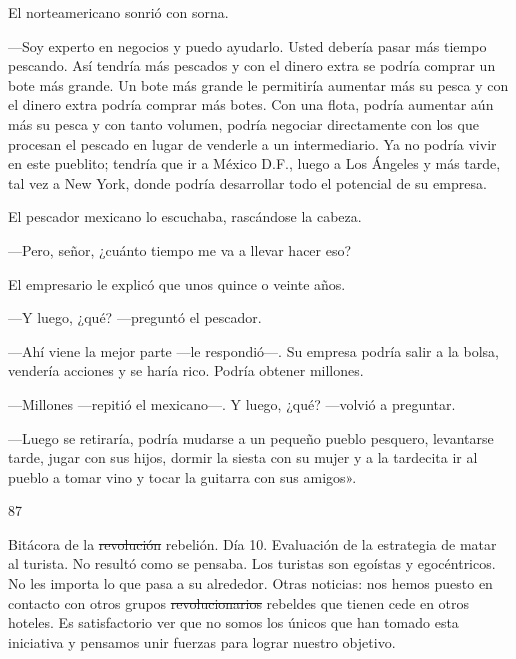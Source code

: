 \documentclass[12pt,twoside,openright,a5paper]{book}
\begin{document}
El norteamericano sonrió con sorna. 

---Soy experto en negocios y puedo
ayudarlo. Usted debería pasar más tiempo pescando. Así tendría más
pescados y con el dinero extra se podría comprar un bote más grande. Un
bote más grande le permitiría aumentar más su pesca y con el dinero
extra podría comprar más botes. Con una flota, podría aumentar aún más su
pesca y con tanto volumen, podría negociar directamente con los que procesan
el pescado en lugar de venderle a un intermediario. Ya no podría vivir en
este pueblito; tendría que ir a México D.F., luego a Los Ángeles y más tarde,
tal vez a New York, donde podría desarrollar todo el potencial de su empresa.

El pescador mexicano lo escuchaba, rascándose la cabeza. 

---Pero, señor, ¿cuánto tiempo me va a llevar hacer eso? 

El empresario le explicó que unos quince o veinte años.

---Y luego, ¿qué? ---preguntó el pescador. 

---Ahí viene la mejor parte ---le respondió---. Su empresa podría salir a la bolsa,
vendería acciones y se haría rico. Podría obtener millones. 

---Millones ---repitió el mexicano---. Y luego, ¿qué? ---volvió a preguntar.

---Luego se retiraría,
podría mudarse a un pequeño pueblo pesquero, levantarse tarde, jugar con
sus hijos, dormir la siesta con su mujer y a la tardecita ir al pueblo a
tomar vino y tocar la guitarra con sus amigos».

\vspace{0.5cm}

\hrulefill \hspace{0.1cm}\decofourleft\hspace{0.2cm} 87 \hspace{0.2cm}\decofourright \hspace{0.1cm}\hrulefill

\nopagebreak

\vspace{0.5cm}

\nopagebreak

Bitácora de la \st{revolución} rebelión. Día 10. Evaluación de la estrategia de
matar al turista. No resultó como se pensaba. Los turistas son egoístas y
egocéntricos. No les importa lo que pasa a su alrededor. Otras noticias:
nos hemos puesto en contacto con otros grupos \st{revolucionarios}
rebeldes que tienen
cede en otros hoteles. Es satisfactorio ver que no somos los únicos que han
tomado esta iniciativa y pensamos unir fuerzas para lograr nuestro objetivo.
\end{document}
